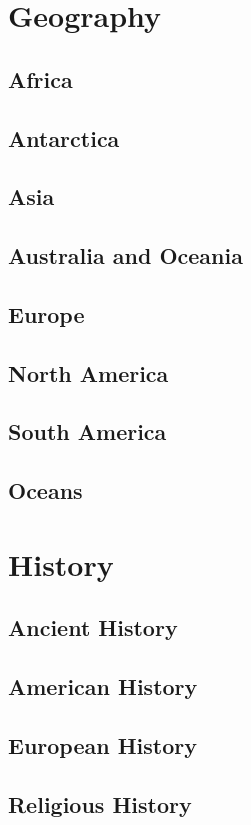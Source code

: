 \documentclass[12pt]{book}
\begin{document}
			
\chapter{Geography}
	\section{Africa}
	\section{Antarctica}
	\section{Asia}
	\section{Australia and Oceania}
	\section{Europe}
	\section{North America}
	\section{South America}
	\section{Oceans}

		


\chapter{History}
	\section{Ancient History}
	\section{American History}
	\section{European History}
	\section{Religious History}
\end{document}
